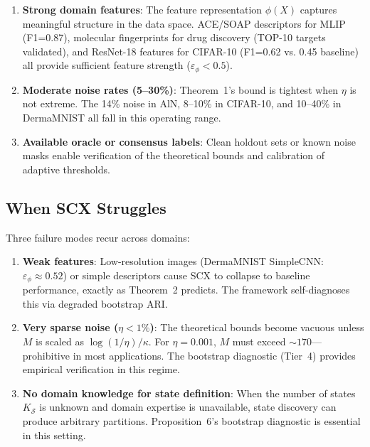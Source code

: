 \documentclass[twocolumn]{article}
\theoremstyle{definition}
\begin{document}
\begin{enumerate}[nosep,leftmargin=*,itemsep=2pt]
  \item \textbf{Strong domain features}: The feature representation $\phi(X)$ captures meaningful structure in the data space. ACE/SOAP descriptors for MLIP (F1=0.87), molecular fingerprints for drug discovery (TOP-10 targets validated), and ResNet-18 features for CIFAR-10 (F1=0.62 vs. 0.45 baseline) all provide sufficient feature strength ($\varepsilon_\phi < 0.5$).
  \item \textbf{Moderate noise rates (5--30\%)}: Theorem~1's bound is tightest when $\eta$ is not extreme. The 14\% noise in AlN, 8--10\% in CIFAR-10, and 10--40\% in DermaMNIST all fall in this operating range.
  \item \textbf{Available oracle or consensus labels}: Clean holdout sets or known noise masks enable verification of the theoretical bounds and calibration of adaptive thresholds.
\end{enumerate}

\subsection{When SCX Struggles}

Three failure modes recur across domains:

\begin{enumerate}[nosep,leftmargin=*,itemsep=2pt]
  \item \textbf{Weak features}: Low-resolution images (DermaMNIST SimpleCNN: $\varepsilon_\phi \approx 0.52$) or simple descriptors cause SCX to collapse to baseline performance, exactly as Theorem~2 predicts. The framework self-diagnoses this via degraded bootstrap ARI.
  \item \textbf{Very sparse noise ($\eta < 1\%$)}: The theoretical bounds become vacuous unless $M$ is scaled as $\log(1/\eta)/\kappa$. For $\eta = 0.001$, $M$ must exceed $\sim 170$---prohibitive in most applications. The bootstrap diagnostic (Tier~4) provides empirical verification in this regime.
  \item \textbf{No domain knowledge for state definition}: When the number of states $K_{\mathcal{S}}$ is unknown and domain expertise is unavailable, state discovery can produce arbitrary partitions. Proposition~6's bootstrap diagnostic is essential in this setting.
\end{enumerate}
\end{document}
